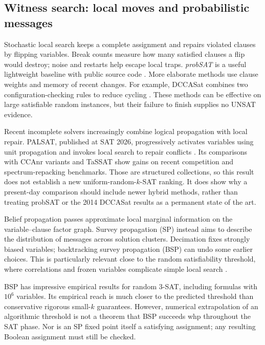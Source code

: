 \subsection{Witness search: local moves and probabilistic messages}
Stochastic local search keeps a complete assignment and repairs violated
clauses by flipping variables. Break counts measure how many satisfied
clauses a flip would destroy; noise and restarts help escape local traps.
\emph{probSAT} is a useful lightweight baseline with public source code
\citep{probsat}. More elaborate methods use clause weights and memory of
recent changes. For example, DCCASat combines two configuration-checking
rules to reduce cycling \citep{luo2014}. These methods can be effective on
large satisfiable random instances, but their failure to finish supplies no
UNSAT evidence.

Recent incomplete solvers increasingly combine logical propagation with local
repair. PALSAT, published at SAT 2026, progressively activates variables using
unit propagation and invokes local search to repair conflicts
\citep{jin2026}. Its comparisons with CCAnr variants and TaSSAT show gains
on recent competition and spectrum-repacking benchmarks. Those are structured
collections, so this result does not establish a new uniform-random-$k$-SAT
ranking. It does show why a present-day comparison should include newer hybrid
methods, rather than treating probSAT or the 2014 DCCASat results as a permanent
state of the art.

Belief propagation passes approximate local marginal information on the
variable--clause factor graph. Survey propagation (SP) instead aims to describe
the distribution of messages across solution clusters. Decimation fixes
strongly biased variables; backtracking survey propagation (BSP) can undo
some earlier choices. This is particularly relevant close to the random
satisfiability threshold, where correlations and frozen variables complicate
simple local search \citep{mmz2006,marino2016}.

BSP has impressive empirical results for random $3$-SAT, including formulas
with $10^6$ variables. Its empirical reach is much closer to the predicted
threshold than conservative rigorous small-$k$ guarantees. However, numerical
extrapolation of an algorithmic threshold is not a theorem that BSP succeeds
whp throughout the SAT phase. Nor is an SP fixed point itself a satisfying
assignment; any resulting Boolean assignment must still be checked.

